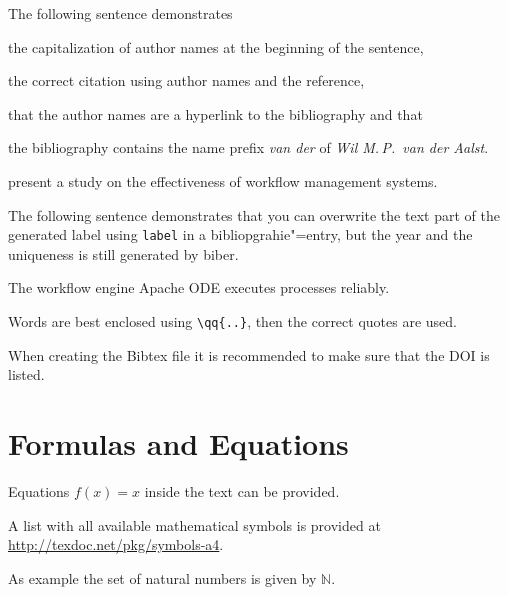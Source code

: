 The following sentence demonstrates
\begin{inparaenum}[1.]
  \item the capitalization of author names at the beginning of the sentence,
  \item the correct citation using author names and the reference,
  \item that the author names are a hyperlink to the bibliography and that
  \item the bibliography contains the name prefix \textit{van der} of \textit{Wil M.\,P.\ van der Aalst}.
\end{inparaenum}

\begin{filecontents*}{\democodefile}
 present a study on the effectiveness of workflow management systems.
\end{filecontents*}

The following sentence demonstrates that you can overwrite the text part of the generated label using \texttt{label} in a bibliopgrahie"=entry, but the year and the uniqueness is still generated by biber.

\begin{filecontents*}{\democodefile}
The workflow engine Apache ODE \cite{ApacheODE} executes \BPEL processes reliably.
\end{filecontents*}

\begin{filecontents*}{\democodefile}
Words are best enclosed using \texttt{\textbackslash qq\{..\}}, then the correct quotes are used.
\end{filecontents*}

When creating the Bibtex file it is recommended to make sure that the DOI is listed.

\section{Formulas and Equations}
\label{sec:mf}

\begin{filecontents}%
Equations $f(x)=x$ inside the text can be provided.
\end{filecontents}

A list with all available mathematical symbols is provided at \url{http://texdoc.net/pkg/symbols-a4}.

\begin{filecontents*}{\democodefile}
As example the set of natural numbers is given by $\mathbb{N}$.
\end{filecontents*}

